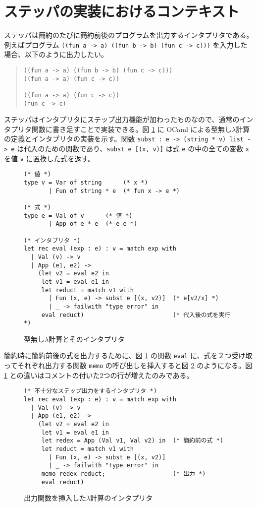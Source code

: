 \section{ステッパの実装におけるコンテキスト}
\label{section:context}

ステッパは簡約のたびに簡約前後のプログラムを出力するインタプリタである。例えばプログラム \texttt{((fun a -> a) ((fun b -> b) (fun c -> c)))} を入力した場合、以下のように出力したい。

\begin{quote}
\begin{verbatim}
((fun a -> a) ((fun b -> b) (fun c -> c)))
((fun a -> a) (fun c -> c))

((fun a -> a) (fun c -> c))
(fun c -> c)
\end{verbatim}
\end{quote}

ステッパはインタプリタにステップ出力機能が加わったものなので、通常のインタプリタ関数に書き足すことで実装できる。図 \ref{figure:lambda} に OCaml による型無し$\lambda$計算の定義とインタプリタの実装を示す。関数 \texttt{subst : e -> (string * v) list -> e} は代入のための関数であり、\texttt{subst e [(x, v)]} は式 \texttt{e} の中の全ての変数 \texttt{x} を値 \texttt{v} に置換した式を返す。

\begin{figure}
\begin{verbatim}
(* 値 *)
type v = Var of string      (* x *)
       | Fun of string * e  (* fun x -> e *)

(* 式 *)
type e = Val of v      (* 値 *)
       | App of e * e  (* e e *)

(* インタプリタ *)
let rec eval (exp : e) : v = match exp with
  | Val (v) -> v
  | App (e1, e2) ->
    (let v2 = eval e2 in
     let v1 = eval e1 in
     let reduct = match v1 with
       | Fun (x, e) -> subst e [(x, v2)]  (* e[v2/x] *)
       | _ -> failwith "type error" in
     eval reduct)                         (* 代入後の式を実行 *)
\end{verbatim}
\caption{型無し$\lambda$計算とそのインタプリタ}
\label{figure:lambda}
\end{figure}

簡約時に簡約前後の式を出力するために、図 \ref{figure:lambda} の関数 \texttt{eval} に、式を２つ受け取ってそれぞれ出力する関数 \texttt{memo} の呼び出しを挿入すると図 \ref{figure:memo_label} のようになる。図 \ref{figure:lambda} との違いはコメントの付いた2つの行が増えたのみである。

\begin{figure}
\begin{verbatim}
(* 不十分なステップ出力をするインタプリタ *)
let rec eval (exp : e) : v = match exp with
  | Val (v) -> v
  | App (e1, e2) ->
    (let v2 = eval e2 in
     let v1 = eval e1 in
     let redex = App (Val v1, Val v2) in  (* 簡約前の式 *)
     let reduct = match v1 with
       | Fun (x, e) -> subst e [(x, v2)]
       | _ -> failwith "type error" in
     memo redex reduct;                   (* 出力 *)
     eval reduct)
\end{verbatim}
\caption{出力関数を挿入した$\lambda$計算のインタプリタ}
\label{figure:memo_label}
\end{figure}

